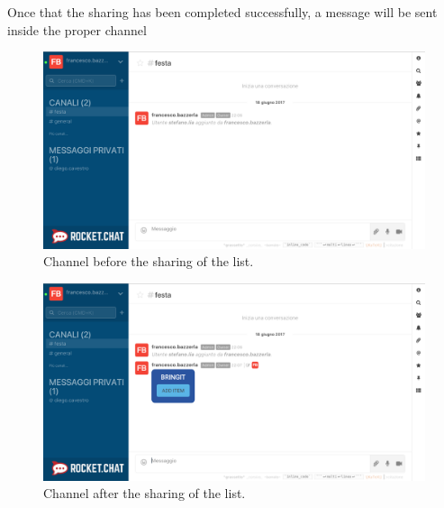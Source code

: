 Once that the sharing has been completed successfully, a message will be sent inside the proper channel


\begin{figure}[H]
  \centering 
  \includegraphics[width=\textwidth]{Sections/3-HowToUse/Images/share_group_before.png}
  \caption{Channel before the sharing of the list.}
\end{figure}

\begin{figure}[H]
  \centering 
  \includegraphics[width=\textwidth]{Sections/3-HowToUse/Images/share_group_after.png}
  \caption{Channel after the sharing of the list.}
\end{figure}